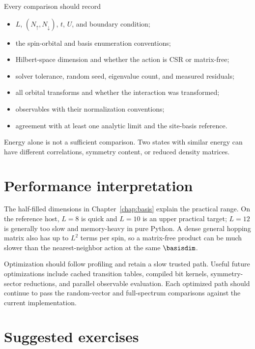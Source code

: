 Every comparison should record
\begin{itemize}
\item $L$, $(N_\uparrow,N_\downarrow)$, $t$, $U$, and boundary condition;
\item the spin-orbital and basis enumeration conventions;
\item Hilbert-space dimension and whether the action is CSR or matrix-free;
\item solver tolerance, random seed, eigenvalue count, and measured residuals;
\item all orbital transforms and whether the interaction was transformed;
\item observables with their normalization conventions;
\item agreement with at least one analytic limit and the site-basis reference.
\end{itemize}
Energy alone is not a sufficient comparison.  Two states with similar energy
can have different correlations, symmetry content, or reduced density
matrices.

\section{Performance interpretation}

The half-filled dimensions in Chapter~\ref{chap:basis} explain the practical
range.  On the reference host, $L=8$ is quick and $L=10$ is an upper practical
target; $L=12$ is generally too slow and memory-heavy in pure Python.  A dense
general hopping matrix also has up to $L^2$ terms per spin, so a matrix-free
product can be much slower than the nearest-neighbor action at the same
$\basisdim$.

Optimization should follow profiling and retain a slow trusted path.  Useful
future optimizations include cached transition tables, compiled bit kernels,
symmetry-sector reductions, and parallel observable evaluation.  Each optimized
path should continue to pass the random-vector and full-spectrum comparisons
against the current implementation.

\section{Suggested exercises}

